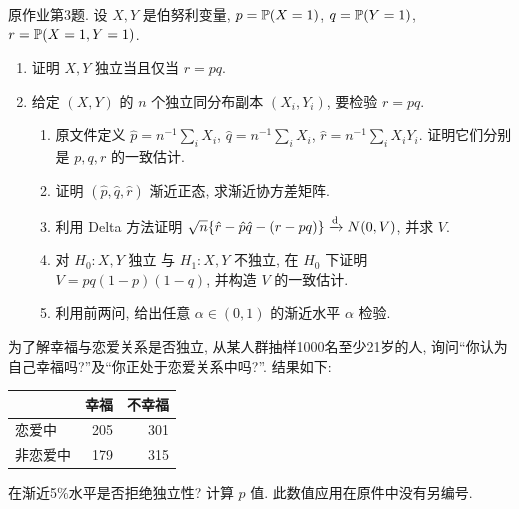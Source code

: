 \begin{exercise}\label{ps06:p03}
原作业第3题. 设 $X,Y$ 是伯努利变量, $p=\mathbb P(X=1)$, $q=\mathbb P(Y=1)$, $r=\mathbb P(X=1,Y=1)$.
\begin{enumerate}[label=\arabic*.]
\item 证明 $X,Y$ 独立当且仅当 $r=pq$.
\item 给定 $(X,Y)$ 的 $n$ 个独立同分布副本 $(X_i,Y_i)$, 要检验 $r=pq$.
\begin{enumerate}[label=\alph*)]
\item 原文件定义 $\hat p=n^{-1}\sum_iX_i$, $\hat q=n^{-1}\sum_iX_i$, $\hat r=n^{-1}\sum_iX_iY_i$. 证明它们分别是 $p,q,r$ 的一致估计.
\item 证明 $(\hat p,\hat q,\hat r)$ 渐近正态, 求渐近协方差矩阵.
\item 利用 Delta 方法证明 $\sqrt n\{\hat r-\hat p\hat q-(r-pq)\}\xrightarrow{\mathrm d} N(0,V)$, 并求 $V$.
\item 对 $H_0:X,Y\text{ 独立}$ 与 $H_1:X,Y\text{ 不独立}$, 在 $H_0$ 下证明 $V=pq(1-p)(1-q)$, 并构造 $V$ 的一致估计.
\item 利用前两问, 给出任意 $\alpha\in(0,1)$ 的渐近水平 $\alpha$ 检验.
\end{enumerate}
\end{enumerate}
为了解幸福与恋爱关系是否独立, 从某人群抽样1000名至少21岁的人, 询问“你认为自己幸福吗?”及“你正处于恋爱关系中吗?”. 结果如下:
\begin{center}
\begin{tabular}{lrr}\toprule
 & 幸福 & 不幸福\\\midrule
恋爱中 &205&301\\
非恋爱中 &179&315\\\bottomrule
\end{tabular}
\end{center}
在渐近5\%水平是否拒绝独立性? 计算 $p$ 值. 此数值应用在原件中没有另编号.
\end{exercise}
